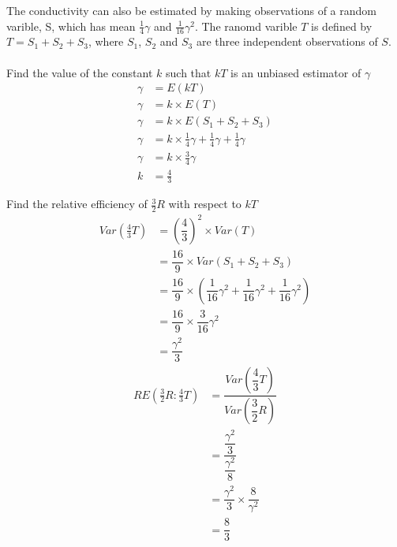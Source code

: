 \begin{example}
        \begin{step}{The conductivity can also be estimated by making observations of a random varible, S, which has mean $\frac{1}{4}\gamma$ and $\frac{1}{16}\gamma^2$. The ranomd varible $T$ is defined by $T = S_1 + S_2 + S_3$, where $S_1$, $S_2$ and $S_3$ are three independent observations of $S$.\\\\Find the value of the constant $k$ such that $kT$ is an unbiased estimator of $\gamma$}
            \begin{align*}
                \gamma &= E(kT)                                                                 \\
                \gamma &= k \times E(T)                                                         \\
                \gamma &= k \times E(S_1 + S_2 + S_3)                                           \\
                \gamma &= k \times \frac{1}{4}\gamma + \frac{1}{4}\gamma + \frac{1}{4}\gamma    \\
                \gamma &= k \times \frac{3}{4}\gamma                                            \\
                k &= \frac{4}{3}
            \end{align*}
        \end{step}

        \begin{step}{Find the relative efficiency of $\frac{3}{2}R$ with respect to $kT$}
            \begin{align*}
            Var\left(\frac{4}{3}T\right) &= \left(\dfrac{4}{3}\right)^2 \times Var(T)       \\
                                         &= \dfrac{16}{9} \times Var(S_1 + S_2 + S_3)       \\
                                         &= \dfrac{16}{9} \times (\dfrac{1}{16}\gamma^2 + \dfrac{1}{16}\gamma^2 + \dfrac{1}{16}\gamma^2)                             \\
                                         &= \dfrac{16}{9} \times \dfrac{3}{16}\gamma^2      \\
                                         &= \dfrac{\gamma^2}{3}
            \end{align*}
            \begin{align*}
                RE\left(\frac{3}{2}R : \frac{4}{3}T\right) &= \dfrac{Var\left(\dfrac{4}{3}T\right)}{ Var\left(\dfrac{3}{2}R\right)} \\
                &= \dfrac{\dfrac{\gamma^2}{3}}{\dfrac{\gamma^2}{8}}      \\
                &= \dfrac{\gamma^2}{3} \times \dfrac{8}{\gamma^2}        \\
                &= \dfrac{8}{3}
            \end{align*}
        \end{step}


\end{example}
